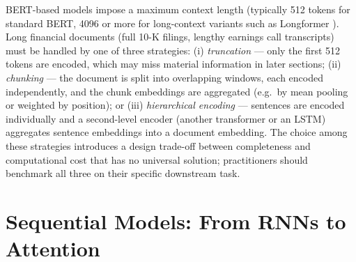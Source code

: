 \begin{deepdive}
\begin{remark}
\label{rem:context-window-limit}
BERT-based models impose a maximum context length (typically 512
tokens for standard BERT, 4096 or more for long-context variants such
as Longformer \cite{beltagy2020}). %
Long financial documents (full 10-K filings, lengthy earnings call
transcripts) must be handled by one of three strategies:
(i) \emph{truncation} — only the first 512 tokens are encoded, which
may miss material information in later sections;
(ii) \emph{chunking} — the document is split into overlapping windows,
each encoded independently, and the chunk embeddings are aggregated
(e.g.\ by mean pooling or weighted by position); or
(iii) \emph{hierarchical encoding} — sentences are encoded individually
and a second-level encoder (another transformer or an LSTM) aggregates
sentence embeddings into a document embedding.  The choice among these
strategies introduces a design trade-off between completeness and
computational cost that has no universal solution; practitioners should
benchmark all three on their specific downstream task.
\end{remark}

\end{deepdive}

\section{Sequential Models: From RNNs to Attention}
\label{sec:sequential}

